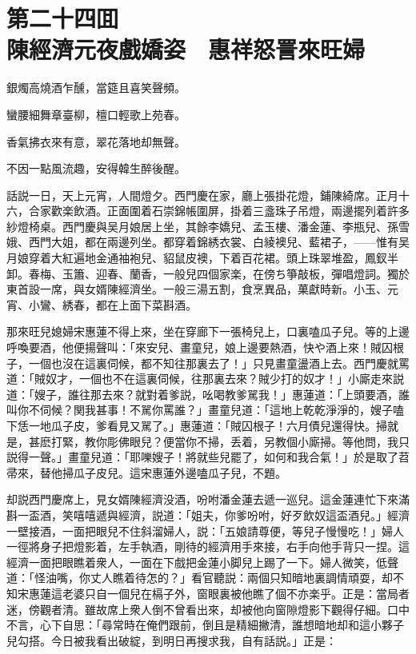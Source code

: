 
\chapter*{第二十四囬　\\陳經濟元夜戲嬌姿　惠祥怒詈來旺婦}


\begin{myquote}
銀燭高燒酒乍醺，當筵且喜笑聲頻。

蠻腰細舞章臺柳，檀口輕歌上苑春。

香氣拂衣來有意，翠花落地却無聲。

不因一點風流趣，安得韓生醉後醒。
\end{myquote}

話説一日，天上元宵，人間燈夕。西門慶在家，廳上張掛花燈，鋪陳綺席。正月十六，合家歡楽飲酒。正面圍着石崇錦帳圍屏，掛着三盞珠子吊燈，兩邊擺列着許多紗燈椅桌。西門慶與吴月娘居上坐，其餘李嬌兒、孟玉樓、潘金蓮、李瓶兒、孫雪娥、西門大姐，都在兩邊列坐。都穿着錦綉衣裳、白綾襖兒、藍裙子，——惟有吴月娘穿着大紅遍地金通袖袍兒、貂鼠皮襖，下着百花裙。頭上珠翠堆盈，鳳釵半卸。春梅、玉簫、迎春、蘭香，一般兒四個家楽，在傍ち箏敲板，彈唱燈詞。獨於東首設一席，與女婿陳經濟坐。一般三湯五割，食烹異品，菓獻時新。小玉、元宵、小鸞、綉春，都在上面下菜斟酒。

那來旺兒媳婦宋惠蓮不得上來，坐在穿廊下一張椅兒上，口裏嗑瓜子兒。等的上邊呼喚要酒，他便揚聲叫：「來安兒、畫童兒，娘上邊要熱酒，快や酒上來！賊囚根子，一個也沒在這裏伺候，都不知往那裏去了！」只見畫童盪酒上去。西門慶就罵道：「賊奴才，一個也不在這裏伺候，往那裏去來？賊少打的奴才！」小廝走來説道：「嫂子，誰往那去來？就對着爹説，吆喝教爹駡我！」惠蓮道：「上頭要酒，誰叫你不伺候？関我甚事！不駡你罵誰？」畫童兒道：「這地上乾乾淨淨的，嫂子嗑下恁一地瓜子皮，爹看見又駡了。」惠蓮道：「賊囚根子！六月債兒還得快。掃就是，甚麽打緊，教你彫佛眼兒？便當你不掃，丢着，另教個小廝掃。等他問，我只説得一聲。」畫童兒道：「耶嚛嫂子！將就些兒罷了，如何和我合氣！」於是取了苕帚來，替他掃瓜子皮兒。這宋惠蓮外邊嗑瓜子兒，不題。

却説西門慶席上，見女婿陳經濟没酒，吩咐潘金蓮去遞一巡兒。這金蓮連忙下來滿斟一盃酒，笑嘻嘻遞與經濟，説道：「姐夫，你爹吩咐，好歹飲奴這盃酒兒。」經濟一壁接酒，一面把眼兒不住斜溜婦人，説：「五娘請尊便，等兒子慢慢吃！」婦人一徑將身子把燈影着，左手執酒，剛待的經濟用手來接，右手向他手背只一捏。這經濟一面把眼瞧着衆人，一面在下戲把金蓮小脚兒上踢了一下。婦人微笑，低聲道：「怪油嘴，你丈人瞧着待怎的？」看官聽説：兩個只知暗地裏調情頑耍，却不知宋惠蓮這老婆只自一個兒在槅子外，窗眼裏被他瞧了個不亦楽乎。正是：當局者迷，傍觀者清。雖故席上衆人倒不曾看出來，却被他向窗隙燈影下觀得仔細。口中不言，心下自思：「尋常時在俺們跟前，倒且是精細撇清，誰想暗地却和這小夥子兒勾搭。今日被我看出破綻，到明日再搜求我，自有話説。」正是：


